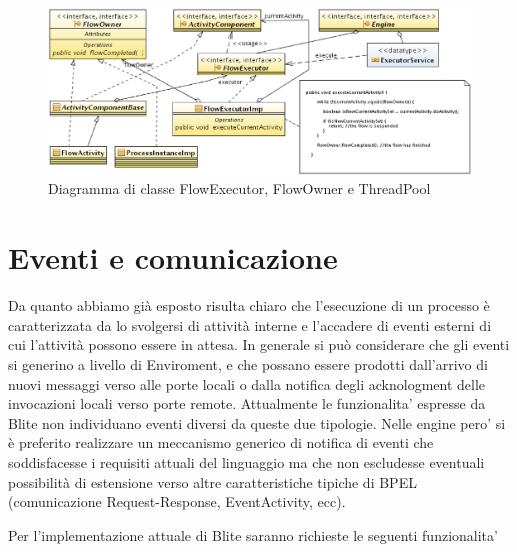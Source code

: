 \begin{figure}[p]
\begin{center}
\includegraphics[angle=90,scale=0.75]
{architettura_interna/dia/flowClassDiagram}
\caption[Diagramma di classe FlowExecutor \ldots] {
   	\textsf{{\small Diagramma di classe FlowExecutor, FlowOwner e ThreadPool}} }
  \label{fig:flowclass}
\end{center}
\end{figure}

\section{Eventi e comunicazione}
Da quanto abbiamo già esposto risulta chiaro che l'esecuzione di un processo \`e
caratterizzata da lo svolgersi di attività interne e l'accadere di eventi
esterni di cui l'attività possono essere in attesa. In generale si può
considerare che gli eventi si generino a livello di Enviroment, e che possano
essere prodotti dall'arrivo di nuovi messaggi verso alle porte locali o
dalla notifica degli acknologment delle invocazioni locali
verso porte remote. Attualmente le funzionalita' espresse da Blite non
individuano eventi diversi da queste due tipologie. Nelle engine pero' si \`e
preferito realizzare un meccanismo generico di notifica di eventi che
soddisfacesse i requisiti attuali del linguaggio ma che non escludesse eventuali
possibilità di estensione verso altre caratteristiche tipiche di BPEL
(comunicazione Request-Response, EventActivity, ecc).

Per l'implementazione attuale di Blite saranno richieste le seguenti
funzionalita'

